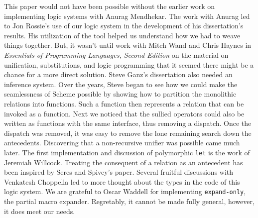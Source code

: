 This paper would not have been possible without the earlier work on
implementing logic systems with Anurag Mendhekar.  The work with
Anurag led to Jon Rossie's use of our logic system in the development
of his dissertation's results.  His utilization of the tool helped us
understand how we had to weave things together.  But, it wasn't until
work with Mitch Wand and Chris Haynes in \emph{Essentials of
Programming Languages, Second Edition} on the material on unification,
substitutions, and logic programming that it seemed there might be a
chance for a more direct solution.  Steve Ganz's dissertation also
needed an inference system.  Over the years, Steve began to see how we
could make the seamlessness of Scheme possible by showing how to
partition the monolithic relations into functions.  Such a function
then represents a relation that can be invoked as a function.  Next we
noticed that the sullied operators could also be written as functions
with the same interface, thus removing a dispatch.  Once the dispatch
was removed, it was easy to remove the lone remaining search down the
antecedents.  Discovering that a non-recursive unifier was possible
came much later.  The first implementation and discussion of
polymorphic \texttt{let} is the work of Jeremiah Willcock.  Treating
the consequent of a relation as an antecedent has been inspired by
Seres and Spivey's paper.  Several fruitful discussions with Venkatesh
Choppella led to more thought about the types in the code of this
logic system.  We are grateful to Oscar Waddell for implementing
\texttt{expand-only}, the partial macro expander.  Regretably, it
cannot be made fully general, however, it does meet our needs.



